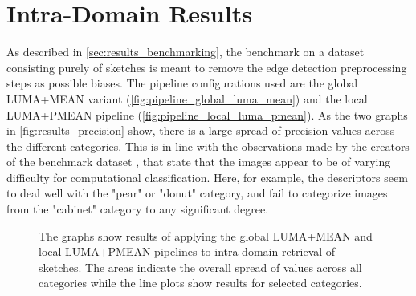 \section{Intra-Domain Results}\label{sec:intra_results}

As described in \autoref{sec:results_benchmarking}, the benchmark on a dataset
consisting purely of sketches is meant to remove the edge detection
preprocessing steps as possible biases. The pipeline configurations used are
the global LUMA+MEAN variant (\autoref{fig:pipeline_global_luma_mean}) and the
local LUMA+PMEAN pipeline (\autoref{fig:pipeline_local_luma_pmean}). As the two
graphs in \autoref{fig:results_precision} show, there is a large spread of
precision values across the different categories. This is in line with the
observations made by the creators of the benchmark dataset
\autocite{eitz_how_2012}, that state that the images appear to be of varying
difficulty for computational classification. Here, for example, the descriptors
seem to deal well with the "pear" or "donut" category, and fail to categorize
images from the "cabinet" category to any significant degree.

\begin{figure}[h]
    \centering
    \quad
    \caption[Precision and Recall Results]{
        The graphs show results of applying the global LUMA+MEAN
         and local LUMA+PMEAN
         pipelines to
        intra-domain retrieval of sketches. The areas indicate the overall
        spread of values across all categories while the line plots show
        results for selected categories.
    }
    \label{fig:results_precision}
\end{figure}
